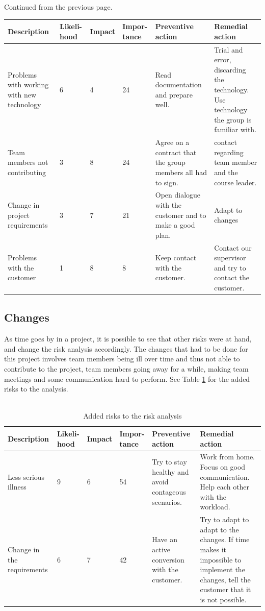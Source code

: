 \begin{center}
\begin{table}[h]
Continued from the previous page.\\
\begin{tabular}{ | m{2.2cm} | m{1cm} | m{1.2cm} | m{1.2cm} | m{2cm} | m{2.2cm} | }
\hline
\textbf{Description} & \textbf{Likeli- hood} & \textbf{Impact} & \textbf{Impor- tance} & \textbf{Preventive action} & \textbf{Remedial action}\\
\hline
    Problems with working with new technology & 6 & 4 & 24 & Read documentation and prepare well. & Trial and error, discarding the technology. Use technology the group is familiar with.\\
\hline
    Team members not contributing & 3 & 8 & 24 & Agree on a contract that the group members all had to sign. & contact regarding team member and the course leader.\\
\hline
    Change in project requirements & 3 & 7 & 21 & Open dialogue with the customer and to make a good plan. & Adapt to changes\\
\hline
    Problems with the customer & 1 & 8 & 8 & Keep contact with the customer. & Contact our supervisor and try to contact the customer.\\
\hline
\end{tabular}
\end{table}
\end{center}
\subsection{Changes}
As time goes by in a project, it is possible to see that other risks were at hand, and change the risk analysis accordingly. The changes that had to be done for this project involves team members being ill over time and thus not able to contribute to the project, team members going away for a while, making team meetings and some communication hard to perform. See Table \ref{addedrisk} for the added risks to the analysis.\\
\\
\begin{center}
\begin{table}[H]
\caption{Added risks to the risk analysis}
\begin{tabular}{ | m{2.2cm} | m{1cm} | m{1.2cm} | m{1.2cm} | m{2cm} | m{2.2cm} | }
\hline
\label{addedrisk}
\textbf{Description} & \textbf{Likeli- hood} & \textbf{Impact} & \textbf{Impor- tance} & \textbf{Preventive action} & \textbf{Remedial action}\\
\hline
    Less serious illness & 9 & 6 & 54 & Try to stay healthy and avoid contageous scenarios. & Work from home. Focus on good communication. Help each other with the workload.\\
\hline
    Change in the requirements & 6 & 7 & 42 & Have an active conversion with the customer. & Try to adapt to adapt to the changes. If time makes it impossible to implement the changes, tell the customer that it is not possible.\\
\hline
\end{tabular}
\end{table}
\end{center}

